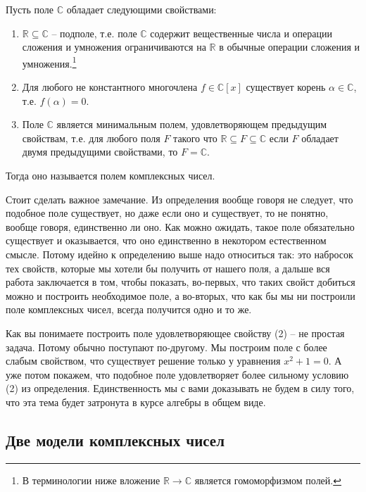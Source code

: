 \begin{definition}
Пусть поле $\mathbb C$ обладает следующими свойствами:
\begin{enumerate}
\item $\mathbb R\subseteq\mathbb C$ -- подполе, т.е. поле $\mathbb C$ содержит вещественные числа и операции сложения и умножения ограничиваются на $\mathbb R$ в обычные операции сложения и умножения.\footnote{В терминологии ниже вложение $\mathbb R\to \mathbb C$ является гомоморфизмом полей.}

\item Для любого не константного многочлена $f\in\mathbb C[x]$ существует корень $\alpha\in \mathbb C$, т.е. $f(\alpha) = 0$.

\item Поле $\mathbb C$ является минимальным полем, удовлетворяющем предыдущим свойствам, т.е. для любого поля $F$ такого что $\mathbb R\subseteq F\subseteq \mathbb C$ если $F$ обладает двумя предыдущими свойствами, то $F = \mathbb C$.
\end{enumerate}
Тогда оно называется полем комплексных чисел.
\end{definition}

Стоит сделать важное замечание. Из определения вообще говоря не следует, что подобное поле существует, но даже если оно и существует, то не понятно, вообще говоря, единственно ли оно. Как можно ожидать, такое поле обязательно существует и оказывается, что оно единственно в некотором естественном смысле. Потому идейно к определению выше надо относиться так: это набросок тех свойств, которые мы хотели бы получить от нашего поля, а дальше вся работа заключается в том, чтобы показать, во-первых, что таких свойст добиться можно и построить необходимое поле, а во-вторых, что как бы мы ни построили поле комплексных чисел, всегда получится одно и то же.

Как вы понимаете построить поле удовлетворяющее свойству (2) -- не простая задача. Потому обычно поступают по-другому. Мы построим поле с более слабым свойством, что существует решение только у уравнения $x^2 + 1 = 0$. А уже потом покажем, что подобное поле удовлетворяет более сильному условию (2) из определения. Единственность мы с вами доказывать не будем в силу того, что эта тема будет затронута в курсе алгебры в общем виде.

\subsection{Две модели комплексных чисел}
\label{subsection::ComplexModels}

